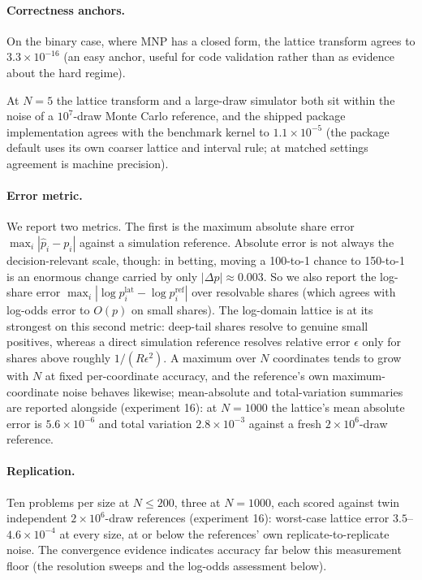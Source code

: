 \documentclass[12pt]{article}
\theoremstyle{remark}
\begin{document}
\paragraph{Correctness anchors.} On the binary case, where MNP has a
closed form, the lattice transform agrees to $3.3\times10^{-16}$ (an easy
anchor, useful for code validation rather than as evidence about the hard
regime).

At $N=5$ the lattice transform and a large-draw simulator both sit
within the noise of a $10^7$-draw Monte Carlo reference, and the shipped
package implementation agrees with the benchmark kernel to
$1.1\times10^{-5}$ (the package default uses its own coarser lattice
and interval rule; at matched settings agreement is machine precision).

\paragraph{Error metric.} We report two metrics. The first is the
maximum absolute share error $\max_i |\hat p_i - p_i|$ against a
simulation reference. Absolute error is not always the decision-relevant
scale, though: in betting, moving a 100-to-1 chance to 150-to-1 is an
enormous change carried by only $|\Delta p| \approx 0.003$. So we also
report the log-share error $\max_i |\log p^{\mathrm{lat}}_i -
\log p_i^{\mathrm{ref}}|$ over resolvable shares (which agrees with
log-odds error to $O(p)$ on small shares). The log-domain lattice is at
its strongest on this second metric: deep-tail shares resolve to genuine
small positives, whereas a direct simulation reference resolves relative
error $\epsilon$ only for shares above roughly $1/(R\epsilon^2)$. A maximum over $N$ coordinates tends to grow with $N$ at fixed
per-coordinate accuracy, and the reference's own maximum-coordinate noise
behaves likewise; mean-absolute and total-variation summaries are reported
alongside (experiment 16): at $N=1000$ the lattice's mean absolute error is
$5.6\times10^{-6}$ and total variation $2.8\times10^{-3}$ against a fresh
$2\times10^6$-draw reference.

\paragraph{Replication.} Ten problems per size at $N \le 200$, three at
$N=1000$, each scored against twin independent $2\times10^6$-draw
references (experiment 16): worst-case lattice error
$3.5$--$4.6\times10^{-4}$ at every size, at or below the references' own
replicate-to-replicate noise. The convergence evidence indicates accuracy far
below this measurement floor (the resolution sweeps and the log-odds
assessment below).
\end{document}
